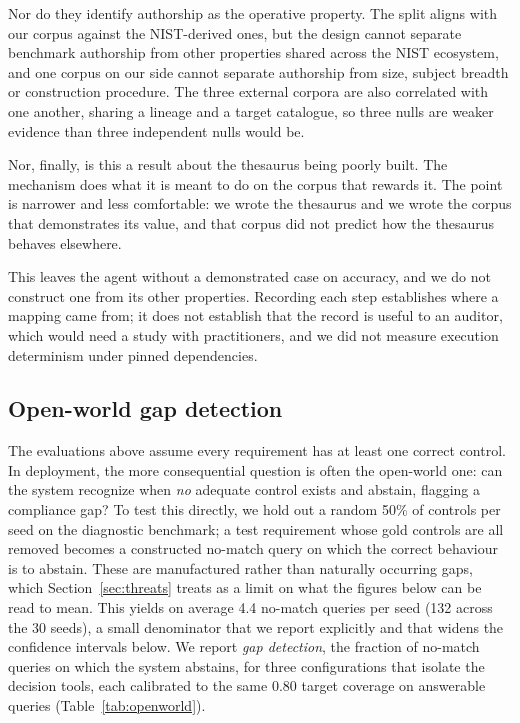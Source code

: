 \documentclass[a4paper,fleqn]{cas-sc}
\begin{document}
Nor do they identify authorship as the operative property. The split aligns with our corpus against the NIST-derived ones, but the design cannot separate benchmark authorship from other properties shared across the NIST ecosystem, and one corpus on our side cannot separate authorship from size, subject breadth or construction procedure. The three external corpora are also correlated with one another, sharing a lineage and a target catalogue, so three nulls are weaker evidence than three independent nulls would be.

Nor, finally, is this a result about the thesaurus being poorly built. The mechanism does what it is meant to do on the corpus that rewards it. The point is narrower and less comfortable: we wrote the thesaurus and we wrote the corpus that demonstrates its value, and that corpus did not predict how the thesaurus behaves elsewhere.

This leaves the agent without a demonstrated case on accuracy, and we do not construct one from its other properties. Recording each step establishes where a mapping came from; it does not establish that the record is useful to an auditor, which would need a study with practitioners, and we did not measure execution determinism under pinned dependencies.

\subsection{Open-world gap detection}
\label{sec:results-openworld}

The evaluations above assume every requirement has at least one correct control.
In deployment, the more consequential question is often the open-world one: can the system recognize when \emph{no} adequate control exists and abstain, flagging a compliance gap?
To test this directly, we hold out a random 50\% of controls per seed on the diagnostic benchmark; a test requirement whose gold controls are all removed becomes a constructed no-match query on which the correct behaviour is to abstain. These are manufactured rather than naturally occurring gaps, which Section~\ref{sec:threats} treats as a limit on what the figures below can be read to mean.
This yields on average 4.4 no-match queries per seed (132 across the 30 seeds), a small denominator that we report explicitly and that widens the confidence intervals below.
We report \emph{gap detection}, the fraction of no-match queries on which the system abstains, for three configurations that isolate the decision tools, each calibrated to the same 0.80 target coverage on answerable queries (Table~\ref{tab:openworld}).
\end{document}
